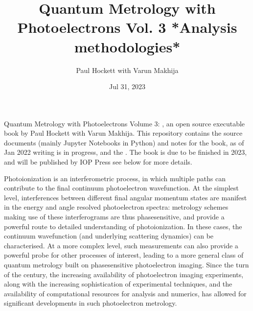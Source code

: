 \documentclass[letterpaper,table,10pt,english]{jupyterBook}
\title{Quantum Metrology with Photoelectrons Vol. 3 *Analysis methodologies*}
\date{Jul 31, 2023}
\author{Paul Hockett with Varun Makhija}
\begin{document}
\pagestyle{empty}
\sphinxmaketitle
\pagestyle{plain}
\sphinxtableofcontents
\pagestyle{normal}
\label{\detokenize{intro::doc}}


\sphinxAtStartPar
Quantum Metrology with Photoelectrons Volume 3: , an open source executable book by Paul Hockett with Varun Makhija. This repository contains the source documents (mainly Jupyter Notebooks in Python) and notes for the book, as of Jan 2022 writing is in progress, and the . The book is due to be finished in 2023, and will be published by IOP Press \sphinxhyphen{} see below for more details.

\begin{DUlineblock}{0em}
\item[] 
\end{DUlineblock}

\sphinxAtStartPar
Photoionization is an interferometric process, in which multiple paths can contribute to the final continuum photoelectron wavefunction. At the simplest level, interferences between different final angular momentum states are manifest in the energy and angle resolved photoelectron spectra: metrology schemes making use of these interferograms are thus phase\sphinxhyphen{}sensitive, and provide a powerful route to detailed understanding of photoionization. In these cases, the continuum wavefunction (and underlying scattering dynamics) can be characterised. At a more complex level, such measurements can also provide a powerful probe for other processes of interest, leading to a more general class of quantum metrology built on phase\sphinxhyphen{}sensitive photoelectron imaging.  Since the turn of the century, the increasing availability of photoelectron imaging experiments, along with the increasing sophistication of experimental techniques, and the availability of computational resources for analysis and numerics, has allowed for significant developments in such photoelectron metrology.

\begin{DUlineblock}{0em}
\item[] 
\end{DUlineblock}
\end{document}
